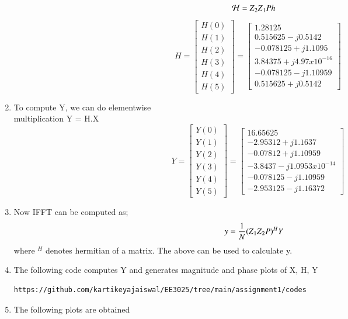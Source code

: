 \documentclass[journal,12pt,twocolumn]{IEEEtran}
\renewcommand\thesection{\arabic{section}}
\begin{document}
\begin{enumerate}[label=\thesection.\arabic*.,ref=\thesection.\theenumi]
\begin{align}
    \mathcal 
    H &= Z\textsubscript{2}Z\textsubscript{1}Ph
\end{align}
\begin{equation}
H = 
\begin{bmatrix}
H(0) \\ 
H(1) \\ 
H(2) \\ 
H(3) \\ 
H(4) \\ 
H(5) 
\end{bmatrix}
= 
\begin{bmatrix}
1.28125 \\ 
0.515625-j0.5142 \\ 
-0.078125+j1.1095 \\ 
3.84375 +j4.97x10^{-16} \\ 
-0.078125-j1.10959 \\ 
0.515625+j0.5142
\end{bmatrix}
\end{equation}
\item 
To compute Y, we can do elementwise \\ multiplication Y = H.X
\begin{equation}
Y = 
\begin{bmatrix}
Y(0) \\ 
Y(1) \\ 
Y(2) \\ 
Y(3) \\ 
Y(4) \\ 
Y(5) 
\end{bmatrix}
= 
\begin{bmatrix}
16.65625 \\ 
-2.95312+j1.1637 \\ 
-0.07812+j1.10959 \\ 
-3.8437 -j1.0953x10^{-14} \\ 
-0.078125-j1.10959 \\ 
-2.953125-j1.16372
\end{bmatrix}
\end{equation}

\item 
Now IFFT can be computed as;
\begin{equation}
\begin{aligned}
    y&= \frac{1}{N}(Z\textsubscript{1}Z\textsubscript{2}P)^HY 
\end{aligned}
\end{equation}
where $^{H}$ denotes hermitian of a matrix. 
The above can be used to calculate y.
\item
The following code computes Y and generates magnitude and phase plots of X, H, Y
\begin{lstlisting}
https://github.com/kartikeyajaiswal/EE3025/tree/main/assignment1/codes
\end{lstlisting}
\item The following plots are obtained


\end{enumerate}
\end{document}

